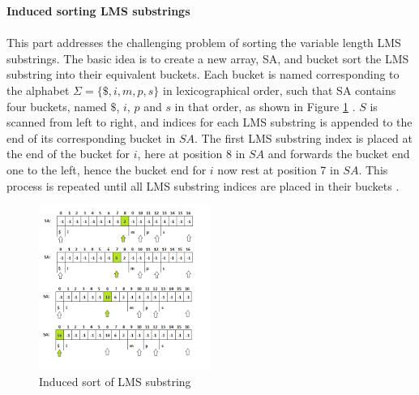 \documentclass[12pt]{article} %
\begin{document}
\textbf{Induced sorting LMS substrings}
\\ \\
This part addresses the challenging problem of sorting the variable length LMS substrings. The basic idea is to create a new array, SA, and bucket sort the LMS substring into their equivalent buckets. Each bucket is named corresponding to the alphabet $\Sigma=\{\$,i,m,p,s\}$ in lexicographical order, such that SA contains four buckets, named $\$$, $i$, $p$ and $s$ in that order, as shown in Figure \ref{fig:SAIS_LMS} \cite{twoeffecient}.
$S$ is scanned from left to right, and indices for each LMS substring is appended to the end of its corresponding bucket in $SA$. The first LMS substring index is placed at the end of the bucket for $i$, here at position 8 in $SA$ and forwards the bucket end one to the left, hence the bucket end for $i$ now rest at position 7 in $SA$. This process is repeated until all LMS substring indices are placed in their buckets \cite{twoeffecient}.

\begin{figure}[H]
    \centering
    \includegraphics[width=0.5\textwidth]{SAIS_LMS}
    \captionsetup{width=0.8\textwidth}
    \caption{Induced sort of LMS substring}
    \label{fig:SAIS_LMS}
\end{figure}
\end{document}
